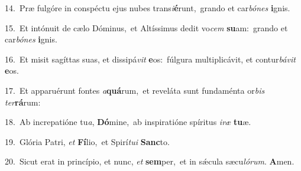 {\numbfont\textcolor{\numbcolor}{14.}}~Præ fulgóre in conspéctu ejus nubes trans\-\textit{i}\-\textbf{é}runt,~\star grando et car\-\textit{bó}\-\textit{nes} \textbf{i}\-gnis.\par
{\numbfont\textcolor{\numbcolor}{15.}}~Et intónuit de cælo Dóminus,~\dagger et Altíssimus dedit vo\textit{cem} \textbf{su}\-am:~\star grando et car\-\textit{bó}\-\textit{nes} \textbf{i}\-gnis.\par
{\numbfont\textcolor{\numbcolor}{16.}}~Et misit sagíttas suas, et dissipá\textit{vit} \textbf{e}\-os:~\star fúlgura multiplicávit, et contur\-\textit{bá}\-\textit{vit} \textbf{e}\-os.\par
{\numbfont\textcolor{\numbcolor}{17.}}~Et apparuérunt fontes \textit{a}\-\textbf{quá}rum,~\star et reveláta sunt fundaménta or\textit{bis} \textit{ter}\-\textbf{rá}rum:\par
{\numbfont\textcolor{\numbcolor}{18.}}~Ab increpatióne tu\-\textit{a}\-, \textbf{Dó}\-mine,~\star ab inspiratióne spíritus \textit{i}\-\textit{ræ} \textbf{tu}\-æ.\par
{\numbfont\textcolor{\numbcolor}{19.}}~Glória Patri, \textit{et} \textbf{Fí}\-lio,~\star et Spirí\-\textit{tu}\-\textit{i} \textbf{Sanc}\-to.\par
{\numbfont\textcolor{\numbcolor}{20.}}~Sicut erat in princípio, et nunc, \textit{et} \textbf{sem}\-per,~\star et in sǽcula sæcu\-\textit{ló}\-\textit{rum}. \textbf{A}\-men.\par
